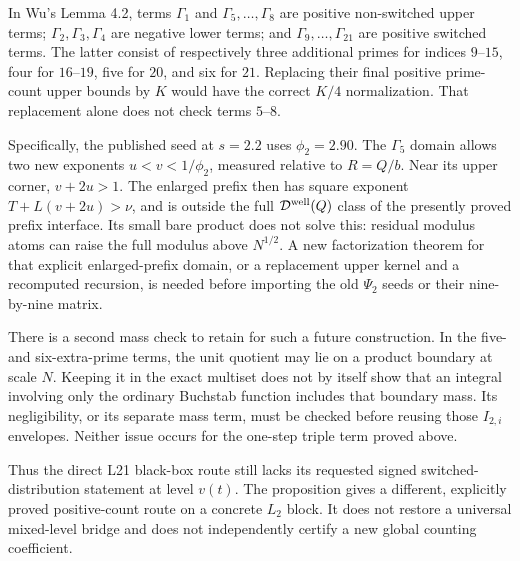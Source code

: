 In Wu's Lemma 4.2, terms $\Gamma_1$ and $\Gamma_5,\ldots,\Gamma_8$
are positive non-switched upper terms; $\Gamma_2,\Gamma_3,\Gamma_4$
are negative lower terms; and $\Gamma_9,\ldots,\Gamma_{21}$ are
positive switched terms. The latter consist of respectively three
additional primes for indices $9$--$15$, four for $16$--$19$, five
for $20$, and six for $21$. Replacing their final positive prime-count
upper bounds by $K$ would have the correct $K/4$ normalization.
That replacement alone does not check terms $5$--$8$.

Specifically, the published seed at $s=2.2$ uses $\phi_2=2.90$.
The $\Gamma_5$ domain allows two new exponents $u<v<1/\phi_2$,
measured relative to $R=Q/b$. Near its upper corner,
$v+2u>1$. The enlarged prefix then has square exponent
$T+L(v+2u)>\nu$, and is outside the full
$\mathcal D^{\rm well}(Q)$ class of the presently proved prefix
interface. Its small bare product does not solve this: residual
modulus atoms can raise the full modulus above $N^{1/2}$.
A new factorization theorem for that explicit enlarged-prefix domain,
or a replacement upper kernel and a recomputed recursion, is needed
before importing the old $\Psi_2$ seeds or their nine-by-nine matrix.

There is a second mass check to retain for such a future construction.
In the five- and six-extra-prime terms, the unit quotient may lie on
a product boundary at scale $N$. Keeping it in the exact multiset
does not by itself show that an integral involving only the ordinary
Buchstab function includes that boundary mass. Its negligibility,
or its separate mass term, must be checked before reusing those
$I_{2,i}$ envelopes. Neither issue occurs for the one-step triple
term proved above.

Thus the direct L21 black-box route still lacks its requested signed
switched-distribution statement at level $v(t)$. The proposition gives
a different, explicitly proved positive-count route on a concrete
$L_2$ block. It does not restore a universal mixed-level bridge and
does not independently certify a new global counting coefficient.
